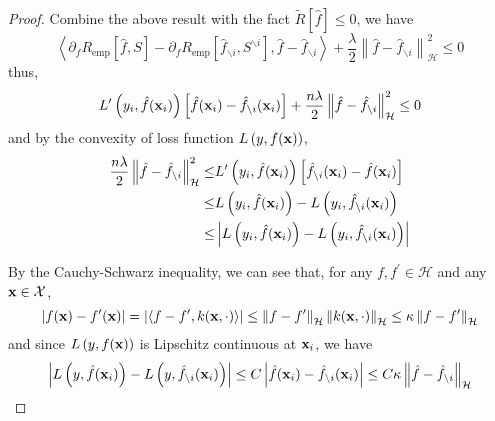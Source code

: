 \begin{proof}
	Combine the above result with the fact $\tilde{R}[\hat{f}]\leq 0$, we have
	\begin{equation}
		\left\langle\partial_{f}R_{\text{emp}}\left[\hat{f},S\right]-\partial_{f}R_{\text{emp}}\left[\hat{f}_{\backslash i},S^{\backslash i}\right],\hat{f}-\hat{f}_{\backslash i}\right\rangle+\frac{\lambda}{2}\left\|\hat{f}-\hat{f}_{\backslash i}\right\|_{\mathcal{H}}^{2}\leq 0
	\end{equation}
	thus,
	\begin{equation}
		L^{\prime}\left(y_{i},\hat{f}({\bf x}_{i})\right)\left[\hat{f}({\bf x}_{i})-\hat{f}_{\backslash i}({\bf x}_{i})\right]+\frac{n\lambda}{2}\left\|\hat{f}-\hat{f}_{\backslash i}\right\|_{\mathcal{H}}^{2}\leq 0
	\end{equation}
	and by the convexity of loss function $L\left(y,f({\bf x})\right)$,
	\begin{equation}
		\label{eq:rkhs-norm-by-derviative-of-tilde-R}
		\begin{aligned}
			\frac{n\lambda}{2}\left\|\hat{f}-\hat{f}_{\backslash i}\right\|_{\mathcal{H}}^{2}\leq & L^{\prime}\left(y_{i},\hat{f}({\bf x}_{i})\right)\left[\hat{f}_{\backslash i}({\bf x}_{i})-\hat{f}({\bf x}_{i})\right] \\
			\leq                                                                                  & L\left(y_{i},\hat{f}({\bf x}_{i})\right)-L\left(y_{i},\hat{f}_{\backslash i}({\bf x}_{i})\right)                    \\
			\leq                                                                                  & \left|L\left(y_{i},\hat{f}({\bf x}_{i})\right)-L\left(y_{i},\hat{f}_{\backslash i}({\bf x}_{i})\right)\right|
		\end{aligned}
	\end{equation}

	By the Cauchy-Schwarz inequality, we can see that, for any $f,f^{\prime}\in\mathcal{H}$ and any ${\bf x}\in{\mathcal X}$,
	\begin{equation}
		\left|f({\bf x})-f^{\prime}({\bf x})\right|=\left|\left\langle f-f^{\prime},k({\bf x},\cdot)\right\rangle\right|\leq\left\|f-f^{\prime}\right\|_{\mathcal{H}}\left\|k({\bf x},\cdot)\right\|_{\mathcal{H}}\leq\kappa\left\|f-f^{\prime}\right\|_{\mathcal{H}}
	\end{equation}
	and since $L\left(y,f({\bf x})\right)$ is Lipschitz continuous at ${\bf x}_{i}$,  we have
	\begin{equation}
		\label{eq:rkhs-norm-by-lipshitz-continuous}
		\left|L\left(y,\hat{f}({\bf x}_{i})\right)-L\left(y,\hat{f}_{\backslash i}({\bf x}_{i})\right)\right|\leq C\left|\hat{f}({\bf x}_{i})-\hat{f}_{\backslash i}({\bf x}_{i})\right|\leq C\kappa\left\|\hat{f}-\hat{f}_{\backslash i}\right\|_{\mathcal{H}}
	\end{equation}


\end{proof}
